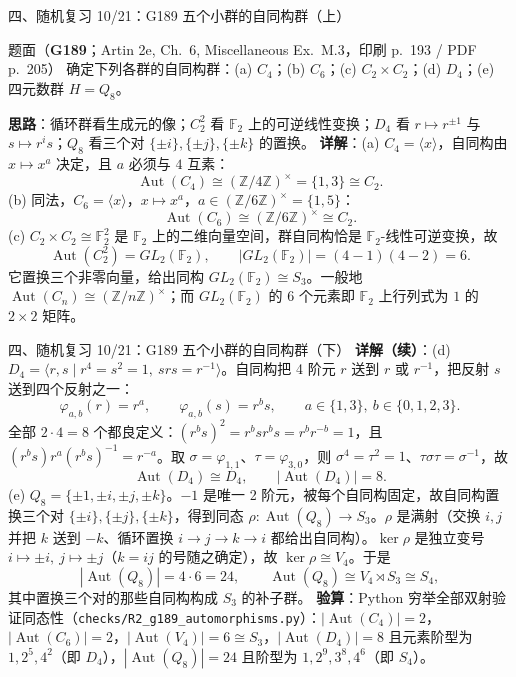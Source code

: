 \documentclass[aspectratio=169,10pt,fontset=none]{ctexbeamer}
\newcommand{\ex}[1]{\textcolor{accent}{\footnotesize\bfseries #1}}
\newcommand{\key}[1]{\textcolor{ink}{\bfseries #1}}
\begin{document}
\begin{frame}[t]{四、随机复习 10/21：G189 五个小群的自同构群（上）}
\label{ex:G189}
\scriptsize
\begin{block}{\footnotesize 题面（\ex{G189}；Artin 2e, Ch.~6, Miscellaneous Ex.~M.3，印刷 p.~193 / PDF p.~205）}
确定下列各群的自同构群：(a) $C_4$；(b) $C_6$；(c) $C_2\times C_2$；(d) $D_4$；(e) 四元数群 $H=Q_8$。
\end{block}
\key{思路}：循环群看生成元的像；$C_2^2$ 看 $\mathbb F_2$ 上的可逆线性变换；$D_4$ 看 $r\mapsto r^{\pm1}$ 与 $s\mapsto r^is$；$Q_8$ 看三个对 $\{\pm i\},\{\pm j\},\{\pm k\}$ 的置换。
\key{详解}：(a) $C_4=\langle x\rangle$，自同构由 $x\mapsto x^a$ 决定，且 $a$ 必须与 $4$ 互素：
\[ \operatorname{Aut}(C_4)\cong(\mathbb Z/4\mathbb Z)^\times=\{1,3\}\cong C_2. \]
(b) 同法，$C_6=\langle x\rangle$，$x\mapsto x^a$，$a\in(\mathbb Z/6\mathbb Z)^\times=\{1,5\}$：
\[ \operatorname{Aut}(C_6)\cong(\mathbb Z/6\mathbb Z)^\times\cong C_2. \]
(c) $C_2\times C_2\cong\mathbb F_2^2$ 是 $\mathbb F_2$ 上的二维向量空间，群自同构恰是 $\mathbb F_2$-线性可逆变换，故
\[ \operatorname{Aut}(C_2^2)=GL_2(\mathbb F_2),\qquad |GL_2(\mathbb F_2)|=(4-1)(4-2)=6. \]
它置换三个非零向量，给出同构 $GL_2(\mathbb F_2)\cong S_3$。一般地 $\operatorname{Aut}(C_n)\cong(\mathbb Z/n\mathbb Z)^\times$；而 $GL_2(\mathbb F_2)$ 的 6 个元素即 $\mathbb F_2$ 上行列式为 $1$ 的 $2\times2$ 矩阵。
\end{frame}

\begin{frame}[t]{四、随机复习 10/21：G189 五个小群的自同构群（下）}
\scriptsize
\key{详解（续）}：(d) $D_4=\langle r,s\mid r^4=s^2=1,\ srs=r^{-1}\rangle$。自同构把 4 阶元 $r$ 送到 $r$ 或 $r^{-1}$，把反射 $s$ 送到四个反射之一：
\[ \varphi_{a,b}(r)=r^a,\qquad \varphi_{a,b}(s)=r^bs,\qquad a\in\{1,3\},\ b\in\{0,1,2,3\}. \]
全部 $2\cdot4=8$ 个都良定义：$(r^bs)^2=r^bsr^bs=r^br^{-b}=1$，且 $(r^bs)r^a(r^bs)^{-1}=r^{-a}$。取 $\sigma=\varphi_{1,1}$、$\tau=\varphi_{3,0}$，则 $\sigma^4=\tau^2=1$、$\tau\sigma\tau=\sigma^{-1}$，故
\[ \operatorname{Aut}(D_4)\cong D_4,\qquad |\operatorname{Aut}(D_4)|=8. \]
(e) $Q_8=\{\pm1,\pm i,\pm j,\pm k\}$。$-1$ 是唯一 2 阶元，被每个自同构固定，故自同构置换三个对 $\{\pm i\},\{\pm j\},\{\pm k\}$，得到同态 $\rho:\operatorname{Aut}(Q_8)\to S_3$。$\rho$ 是满射（交换 $i,j$ 并把 $k$ 送到 $-k$、循环置换 $i\to j\to k\to i$ 都给出自同构）。$\ker\rho$ 是独立变号 $i\mapsto\pm i,\ j\mapsto\pm j$（$k=ij$ 的号随之确定），故 $\ker\rho\cong V_4$。于是
\[ |\operatorname{Aut}(Q_8)|=4\cdot6=24,\qquad \operatorname{Aut}(Q_8)\cong V_4\rtimes S_3\cong S_4, \]
其中置换三个对的那些自同构构成 $S_3$ 的补子群。
\key{验算}：Python 穷举全部双射验证同态性（\texttt{checks/R2\_g189\_automorphisms.py}）：$|\operatorname{Aut}(C_4)|=2$，$|\operatorname{Aut}(C_6)|=2$，$|\operatorname{Aut}(V_4)|=6\cong S_3$，$|\operatorname{Aut}(D_4)|=8$ 且元素阶型为 $1,2^5,4^2$（即 $D_4$），$|\operatorname{Aut}(Q_8)|=24$ 且阶型为 $1,2^9,3^8,4^6$（即 $S_4$）。
\end{frame}
\end{document}
